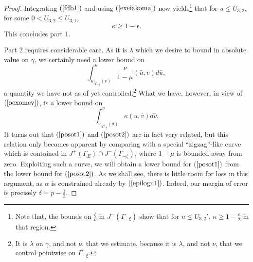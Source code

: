 \documentclass{article}
\newcommand{\zn}{\frac{\zeta}{\nu}}
\begin{document}
{\begin{proof}
Integrating $(\ref{fdb1})$ and using $(\ref{exeiakoma})$ now 
yields\footnote{Note that, the bounds on $\zn$ in
$J^{-}(\Gamma_{-\xi})$ show that for $u\le U_{3,2}'$,
$\kappa\ge1-\frac{\epsilon}2$ in that region.}
that for $u\le U_{3,2}$, for some $0<U_{3,2}\le U_{3,1}$,
\begin{equation}
\label{oexomev}
\kappa\ge1-\epsilon.
\end{equation}
This concludes part 1.

Part 2 requires considerable care. As it is $\lambda$ which we desire
to bound in absolute value on $\gamma$, we certainly need
a lower bound on 
\begin{equation}
\label{posot1}
\int_{u|_{\Gamma_{-\xi}}(v)}^u\frac{\nu}{1-\mu}(\bar{u},v)d\bar{u},
\end{equation}
a quantity we have not as of yet
controlled.\footnote{It is $\lambda$ on $\gamma$, 
and not $\nu$, that we estimate, because
it is $\lambda$, and not $\nu$, that we control pointwise
on $\Gamma_{-\xi}$.} What we have, however, in view of $(\ref{oexomev})$,
is a lower bound on 
\begin{equation}
\label{posot2}
\int_{v|_{\Gamma_{-\xi}}(u)}^v \kappa(u,\bar{v})d\bar{v}.
\end{equation}
It turns out that $(\ref{posot1})$ and $(\ref{posot2})$ are
in fact very related, but
this relation only becomes apparent by comparing with
a special ``zigzag''-like curve which is contained in 
$J^+(\Gamma_E)\cap J^-(\Gamma_{-\xi})$, 
where $1-\mu$ is bounded
away from zero. Exploiting such a curve, we will
obtain a lower bound for $(\ref{posot1})$ from
the lower bound for $(\ref{posot2})$. As we shall see,
there is little room for loss in this argument,
as $\alpha$ is constrained already by 
$(\ref{epilogn1})$. Indeed, our margin of error
is precisely $\delta=p-\frac12$.



\end{proof}}
\end{document}
